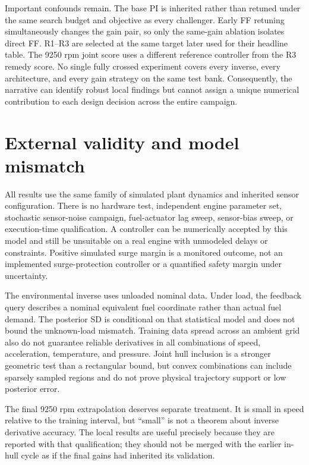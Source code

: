 Important confounds remain. The base PI is inherited rather than retuned under the same search budget and objective as every challenger. Early FF retuning simultaneously changes the gain pair, so only the same-gain ablation isolates direct FF. R1--R3 are selected at the same target later used for their headline table. The 9250 rpm joint score uses a different reference controller from the R3 remedy score. No single fully crossed experiment covers every inverse, every architecture, and every gain strategy on the same test bank. Consequently, the narrative can identify robust local findings but cannot assign a unique numerical contribution to each design decision across the entire campaign.

\section{External validity and model mismatch}
All results use the same family of simulated plant dynamics and inherited sensor configuration. There is no hardware test, independent engine parameter set, stochastic sensor-noise campaign, fuel-actuator lag sweep, sensor-bias sweep, or execution-time qualification. A controller can be numerically accepted by this model and still be unsuitable on a real engine with unmodeled delays or constraints. Positive simulated surge margin is a monitored outcome, not an implemented surge-protection controller or a quantified safety margin under uncertainty.

The environmental inverse uses unloaded nominal data. Under load, the feedback query describes a nominal equivalent fuel coordinate rather than actual fuel demand. The posterior SD is conditional on that statistical model and does not bound the unknown-load mismatch. Training data spread across an ambient grid also do not guarantee reliable derivatives in all combinations of speed, acceleration, temperature, and pressure. Joint hull inclusion is a stronger geometric test than a rectangular bound, but convex combinations can include sparsely sampled regions and do not prove physical trajectory support or low posterior error.

The final 9250 rpm extrapolation deserves separate treatment. It is small in speed relative to the training interval, but ``small'' is not a theorem about inverse derivative accuracy. The local results are useful precisely because they are reported with that qualification; they should not be merged with the earlier in-hull cycle as if the final gains had inherited its validation.

